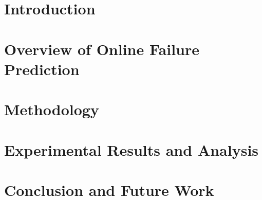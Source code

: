\documentclass[12pt,letterpaper,oneside]{book}
\begin{document}
\frontmatter
	\flyleaf                        
	\disclaimerpage                 
	\titlepageAFIT                      
	\committeepage  
	
	
	\tableofcontents
	\listoffigures
	\listoftables
\mainmatter

\chapter{Introduction} \label{chapter1}


\chapter{Overview of Online Failure Prediction} \label{chapter2}


\chapter{Methodology}


\chapter{Experimental Results and Analysis}

\chapter{Conclusion and Future Work}


\backmatter
	\singlespace
	
	 
	
	\clearpage
	
\end{document}
